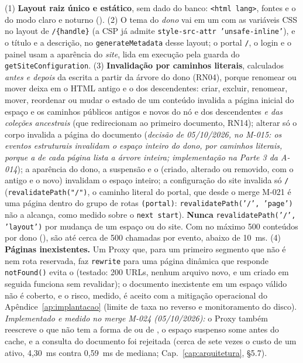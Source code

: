 {(1) \textbf{Layout raiz único e estático}, sem dado do banco: \texttt{<html lang>}, fontes e o  do modo claro e noturno (). (2) O tema do \emph{dono} vai em um  com as variáveis CSS no layout de \texttt{/\{handle\}} (a CSP já admite \texttt{style-src-attr 'unsafe-inline'}), e o título e a descrição, no \texttt{generateMetadata} desse layout; o portal \texttt{/}, o login e o painel usam a aparência do \emph{site}, lida em execução pela guarda do \texttt{getSiteConfiguration}. (3) \textbf{Invalidação por caminhos literais}, calculados \emph{antes e depois} da escrita a partir da árvore do dono (RN04), porque renomear ou mover deixa em  o HTML antigo e o dos descendentes: criar, excluir, renomear, mover, reordenar ou mudar o estado de um conteúdo invalida a página inicial do espaço e os caminhos públicos antigos e novos do nó e dos descendentes \emph{e das coleções ancestrais} (que redirecionam ao primeiro documento, RN14); alterar só o corpo invalida a página do documento (\emph{decisão de 05/10/2026, no M-015: os eventos estruturais invalidam o espaço inteiro do dono, por caminhos literais, porque a}  \emph{de cada página lista a árvore inteira; implementação na Parte 3 da A-014}); a aparência do dono, a suspensão e o  (criado, alterado ou removido, com o antigo e o novo) invalidam o espaço inteiro; a configuração do site invalida só \texttt{/} (\texttt{revalidatePath("/")}, o caminho literal do portal, que desde o merge M-021 é uma página dentro do grupo de rotas \texttt{(portal)}: \texttt{revalidatePath('/', 'page')} não a alcança, como medido sobre o \texttt{next start}). \textbf{Nunca} \texttt{revalidatePath('/', 'layout')} por mudança de um espaço ou do site. Com no máximo 500 conteúdos por dono (), são até cerca de 500 chamadas por evento, abaixo de 10~ms. (4) \textbf{Páginas inexistentes.} Um Proxy que, para um primeiro segmento que não é  nem rota reservada, faz \texttt{rewrite} para uma página dinâmica que responde \texttt{notFound()} evita o  (testado: 200 URLs, nenhum arquivo novo, e um  criado em seguida funciona sem revalidar); o documento inexistente em um espaço válido não é coberto, e o risco, medido, é aceito com a mitigação operacional do Apêndice~\ref{ap:implantacao} (limite de taxa no  reverso e monitoramento do disco). \emph{Implementado e medido no merge M-024 (05/10/2026):} o Proxy também reescreve o que não tem a forma de  ou de , o espaço suspenso some antes do cache, e a consulta do documento foi rejeitada (cerca de sete vezes o custo de um  ativo, 4,30~ms contra 0,59~ms de mediana; Cap.~\ref{cap:arquitetura}, \S5.7).}
